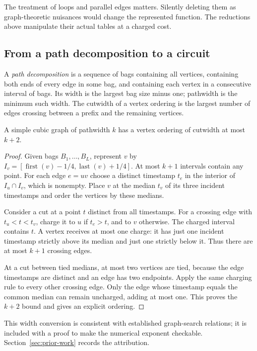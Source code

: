 The treatment of loops and parallel edges matters. Silently deleting
them as graph-theoretic nuisances would change the represented function.
The reductions above manipulate their actual tables at a charged cost.

\subsection{From a path decomposition to a circuit}

A \emph{path decomposition} is a sequence of bags containing all
vertices, containing both ends of every edge in some bag, and containing
each vertex in a consecutive interval of bags. Its width is the largest
bag size minus one; pathwidth is the minimum such width. The cutwidth
of a vertex ordering is the largest number of edges crossing between
a prefix and the remaining vertices.

\begin{lemma}\label{lem:median-width}
A simple cubic graph of pathwidth $k$ has a vertex ordering of cutwidth
at most $k+2$.
\end{lemma}
\begin{proof}
Given bags $B_1,\ldots,B_L$, represent $v$ by
$I_v=[\operatorname{first}(v)-1/4,\operatorname{last}(v)+1/4]$.
At most $k+1$ intervals contain any point. For each edge $e=uv$ choose
a distinct timestamp $t_e$ in the interior of $I_u\cap I_v$, which
is nonempty. Place $v$ at the median $t_v$ of its three incident
timestamps and order the vertices by these medians.

Consider a cut at a point $t$ distinct from all timestamps. For a
crossing edge with $t_u<t<t_v$, charge it to $u$ if $t_e>t$, and to
$v$ otherwise. The charged interval contains $t$. A vertex receives
at most one charge: it has just one incident timestamp strictly above
its median and just one strictly below it. Thus there are at most
$k+1$ crossing edges.

At a cut between tied medians, at most two vertices are tied, because
the edge timestamps are distinct and an edge has two endpoints. Apply
the same charging rule to every other crossing edge. Only the edge
whose timestamp equals the common median can remain uncharged, adding
at most one. This proves the $k+2$ bound and gives an explicit ordering.
\end{proof}

This width conversion is consistent with established graph-search
relations; it is included with a proof to make the numerical exponent
checkable. Section~\ref{sec:prior-work} records the attribution.

